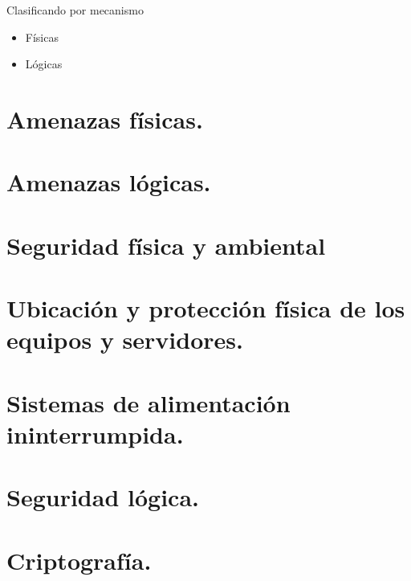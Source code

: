 \documentclass[letterpaper,10pt,spanish]{sphinxmanual}
\begin{document}
Clasificando por mecanismo
\begin{itemize}
\item {} 
Físicas

\item {} 
Lógicas

\end{itemize}


\section{Amenazas físicas.}
\label{\detokenize{tema_pautas_seguridad_informatica/tema_pautas_seguridad_informatica:amenazas-fisicas}}

\section{Amenazas lógicas.}
\label{\detokenize{tema_pautas_seguridad_informatica/tema_pautas_seguridad_informatica:amenazas-logicas}}

\section{Seguridad física y ambiental}
\label{\detokenize{tema_pautas_seguridad_informatica/tema_pautas_seguridad_informatica:seguridad-fisica-y-ambiental}}

\section{Ubicación y protección física de los equipos y servidores.}
\label{\detokenize{tema_pautas_seguridad_informatica/tema_pautas_seguridad_informatica:ubicacion-y-proteccion-fisica-de-los-equipos-y-servidores}}

\section{Sistemas de alimentación ininterrumpida.}
\label{\detokenize{tema_pautas_seguridad_informatica/tema_pautas_seguridad_informatica:sistemas-de-alimentacion-ininterrumpida}}

\section{Seguridad lógica.}
\label{\detokenize{tema_pautas_seguridad_informatica/tema_pautas_seguridad_informatica:seguridad-logica}}

\section{Criptografía.}
\label{\detokenize{tema_pautas_seguridad_informatica/tema_pautas_seguridad_informatica:criptografia}}
\end{document}
